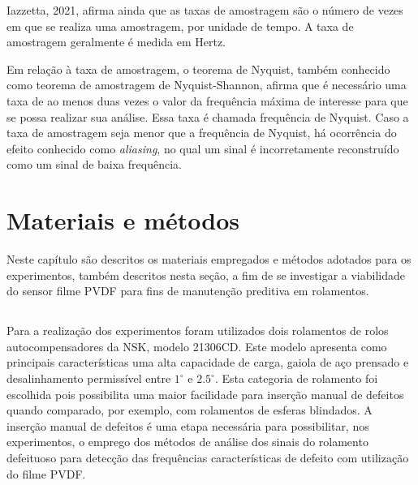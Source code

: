 \documentclass[
	12pt,				
	oneside,			
	a4paper,			
	english,			
	brazil,			
	]{abntex2ppgsi}
\begin{document}
Iazzetta, 2021, afirma ainda que as taxas de amostragem são o número de vezes em que se realiza uma amostragem, por unidade de tempo. A taxa de amostragem geralmente é medida em Hertz. 



Em relação à taxa de amostragem, o teorema de Nyquist, também conhecido como teorema de amostragem de Nyquist-Shannon, afirma que é necessário uma taxa de ao menos duas vezes o valor da frequência máxima de interesse para que se possa realizar sua análise. Essa taxa é chamada frequência de Nyquist. Caso a taxa de amostragem seja menor que a frequência de Nyquist, há ocorrência do efeito conhecido como \textit{aliasing}, no qual um sinal é incorretamente reconstruído como um sinal de baixa frequência.


\chapter{Materiais e métodos}
\label{secao:MateriaisEMetodos}

Neste capítulo são descritos os materiais empregados e métodos adotados para os experimentos, também descritos nesta seção, a fim de se investigar a viabilidade do sensor filme PVDF para fins de manutenção preditiva em rolamentos. 

\section{}

Para a realização dos experimentos foram utilizados dois rolamentos de rolos autocompensadores da NSK, modelo 21306CD. Este modelo apresenta como principais características uma alta capacidade de carga, gaiola de aço prensado e desalinhamento permissível entre $1^{\circ}$ e $2.5^{\circ}$. Esta categoria de rolamento foi escolhida pois possibilita uma maior facilidade para inserção manual de defeitos quando comparado, por exemplo, com rolamentos de esferas blindados. A inserção manual de defeitos é uma etapa necessária para possibilitar, nos experimentos, o emprego dos métodos de análise dos sinais do rolamento defeituoso para detecção das frequências características de defeito com utilização do filme PVDF. 
\end{document}
